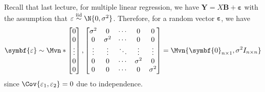 Recall that last lecture, for multiple linear regression,
we have $ \symbf{Y}=X\symbf{B}+\symbf{\varepsilon} $
with the assumption that $ \varepsilon\stackrel{\text{iid}}{\sim}\N{0,\sigma^2} $.
Therefore, for a random vector $ \symbf{\varepsilon} $, we have
\[ \symbf{\varepsilon}\sim\Mvn*{
        \begin{bmatrix}
            0      \\
            0      \\
            \vdots \\
            0      \\
            0
        \end{bmatrix},
        \begin{bmatrix}
            \sigma^2 & 0        & \cdots & 0        & 0        \\
            0        & \sigma^2 & \cdots & 0        & 0        \\
            \vdots   & \vdots   & \ddots & \vdots   & \vdots   \\
            0        & 0        & \cdots & \sigma^2 & 0        \\
            0        & 0        & \cdots & 0        & \sigma^2 \\
        \end{bmatrix}}=
    \Mvn{\symbf{0}_{n\times 1},\sigma^2I_{n\times n}} \]
since $ \Cov{\varepsilon_1,\varepsilon_2}=0 $ due to independence.

